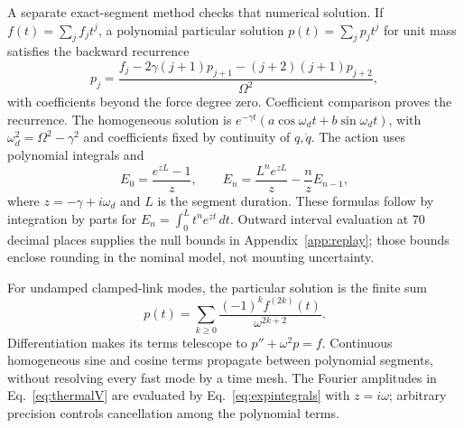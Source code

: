 A separate exact-segment method checks that numerical solution. If $f(t)=\sum_j f_jt^j$, a polynomial particular solution $p(t)=\sum_jp_jt^j$ for unit mass satisfies the backward recurrence
\begin{equation}
p_j=\frac{f_j-2\gamma(j+1)p_{j+1}-(j+2)(j+1)p_{j+2}}{\Omega^2},
\label{eq:recurrence}
\end{equation}
with coefficients beyond the force degree zero. Coefficient comparison proves the recurrence. The homogeneous solution is $e^{-\gamma t}(a\cos\omega_dt+b\sin\omega_dt)$, with $\omega_d^2=\Omega^2-\gamma^2$ and coefficients fixed by continuity of $q,\dot q$. The action uses polynomial integrals and
\begin{equation}
E_0=\frac{e^{zL}-1}{z},\qquad E_n=\frac{L^ne^{zL}}z-\frac nz E_{n-1},
\label{eq:expintegrals}
\end{equation}
where $z=-\gamma+i\omega_d$ and $L$ is the segment duration. These formulas follow by integration by parts for $E_n=\int_0^L t^ne^{zt}\,dt$. Outward interval evaluation at 70 decimal places supplies the null bounds in Appendix~\ref{app:replay}; those bounds enclose rounding in the nominal model, not mounting uncertainty.

For undamped clamped-link modes, the particular solution is the finite sum
\begin{equation}
p(t)=\sum_{k\ge0}\frac{(-1)^k f^{(2k)}(t)}{\omega^{2k+2}}.
\label{eq:undampedparticular}
\end{equation}
Differentiation makes its terms telescope to $p''+\omega^2p=f$. Continuous homogeneous sine and cosine terms propagate between polynomial segments, without resolving every fast mode by a time mesh. The Fourier amplitudes in Eq.~\eqref{eq:thermalV} are evaluated by Eq.~\eqref{eq:expintegrals} with $z=i\omega$; arbitrary precision controls cancellation among the polynomial terms.

